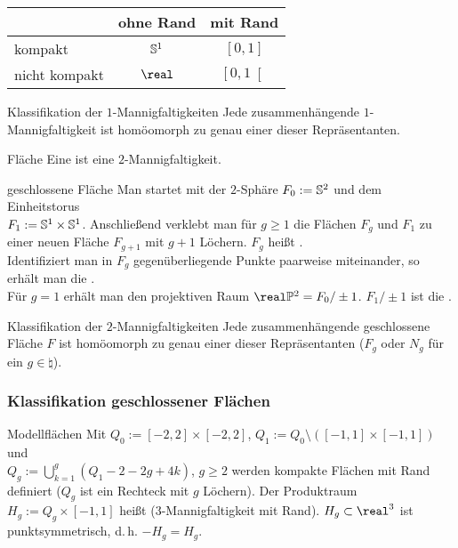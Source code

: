 \begin{tabular}{l|cc}
    & ohne Rand & mit Rand \\ \hline
    kompakt & $\mathbb{S}^1$ & $[0, 1]$ \\
    nicht kompakt & $\real$ & $\left[0, 1\right[$
\end{tabular}

\begin{Satz}{Klassifikation der $1$-Mannigfaltigkeiten}
    Jede zusammenhängende $1$-Mannigfaltigkeit ist homöomorph zu genau einer
    dieser Repräsentanten.
\end{Satz}

\linie

\begin{Def}{Fläche}
    Eine  ist eine $2$-Mannigfaltigkeit.
\end{Def}

\begin{Def}{geschlossene Fläche}
    Man startet mit der $2$-Sphäre $F_0 := \mathbb{S}^2$ und dem Einheitstorus \\
    $F_1 := \mathbb{S}^1 \times \mathbb{S}^1$.
    Anschließend verklebt man für $g \ge 1$ die Flächen $F_g$ und $F_1$ zu
    einer neuen Fläche $F_{g+1}$ mit $g + 1$ Löchern.
    $F_g$ heißt . \\
    Identifiziert man in $F_g$ gegenüberliegende Punkte paarweise miteinander,
    so erhält man die . \\
    Für $g = 1$ erhält man den projektiven Raum
    $\real\projective^2 = F_0/\pm 1$.
    $F_1/\pm 1$ ist die .
\end{Def}

\begin{Satz}{Klassifikation der $2$-Mannigfaltigkeiten}
    Jede zusammenhängende geschlossene Fläche $F$
    ist homöomorph zu genau einer dieser
    Repräsentanten ($F_g$ oder $N_g$ für ein $g \in \natural$).
\end{Satz}

\pagebreak

\subsubsection{%
    Klassifikation geschlossener Flächen%
}

\begin{Def}{Modellflächen}
    Mit $Q_0 := [-2, 2] \times [-2, 2]$,
    $Q_1 := Q_0 \setminus ([-1, 1] \times [-1, 1])$ und \\
    $Q_g := \bigcup_{k=1}^g (Q_1 - 2 - 2g + 4k)$, $g \ge 2$
    werden kompakte Flächen mit Rand definiert
    ($Q_g$ ist ein Rechteck mit $g$ Löchern).
    Der Produktraum $H_g := Q_g \times [-1, 1]$ heißt
    ($3$-Mannigfaltigkeit mit Rand).
    $H_g \subset \real^3$ ist punktsymmetrisch, d.\,h. $-H_g = H_g$.
\end{Def}


